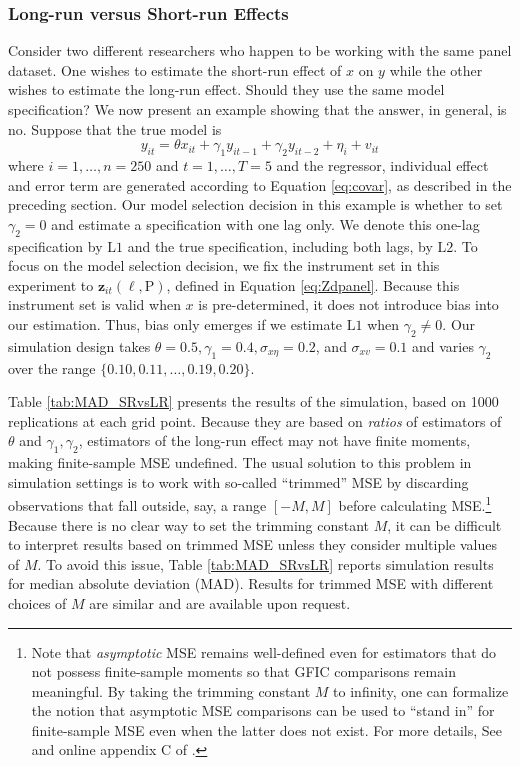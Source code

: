 \subsubsection{Long-run versus Short-run Effects}
\label{sec:SRvsLR}
Consider two different researchers who happen to be working with the same panel dataset. 
One wishes to estimate the short-run effect of $x$ on $y$ while the other wishes to estimate the long-run effect.  
Should they use the same model specification?
We now present an example showing that the answer, in general, is no.
Suppose that the true model is
\[
  y_{it} = \theta x_{it} + \gamma_1 y_{it-1} + \gamma_2 y_{it-2}  + \eta_i + v_{it}
\]
where $i = 1, \dots, n = 250$ and $t = 1, \dots, T=5$ and the regressor, individual effect and error term are generated according to Equation \ref{eq:covar}, as described in the preceding section.
Our model selection decision in this example is whether to set $\gamma_2 = 0$ and estimate a specification with one lag only.
We denote this one-lag specification by $\mbox{L1}$ and the true specification, including both lags, by $\mbox{L2}$.
To focus on the model selection decision, we fix the instrument set in this experiment to $\mathbf{z}_{it}(\ell,\text{P})$, defined in Equation \ref{eq:Zdpanel}.
Because this instrument set is valid when $x$ is pre-determined, it does not introduce bias into our estimation.
Thus, bias only emerges if we estimate $\mbox{L1}$ when $\gamma_2\neq 0$.
Our simulation design takes $\theta = 0.5, \gamma_1 = 0.4, \sigma_{x\eta} = 0.2$, and $\sigma_{xv} = 0.1$ and varies $\gamma_2$ over the range $\{0.10, 0.11, \dots, 0.19, 0.20\}$. 

Table \ref{tab:MAD_SRvsLR} presents the results of the simulation, based on 1000 replications at each grid point.
Because they are based on \emph{ratios} of estimators of $\theta$ and $\gamma_1, \gamma_2$, estimators of the long-run effect may not have finite moments, making finite-sample MSE undefined.
The usual solution to this problem in simulation settings is to work with so-called ``trimmed'' MSE by discarding observations that fall outside, say, a range $[-M, M]$ before calculating MSE.\footnote{Note that \emph{asymptotic} MSE remains well-defined even for estimators that do not possess finite-sample moments so that GFIC comparisons remain meaningful. By taking the trimming constant $M$ to infinity, one can formalize the notion that asymptotic MSE comparisons can be used to ``stand in'' for finite-sample MSE even when the latter does not exist. For more details, See \cite{HansenShrink} and online appendix C of \cite{DiTraglia2016}.}
Because there is no clear way to set the trimming constant $M$, it can be difficult to interpret results based on trimmed MSE unless they consider multiple values of $M$.
To avoid this issue, Table \ref{tab:MAD_SRvsLR} reports simulation results for median absolute deviation (MAD).
Results for trimmed MSE with different choices of $M$ are similar and are available upon request.

